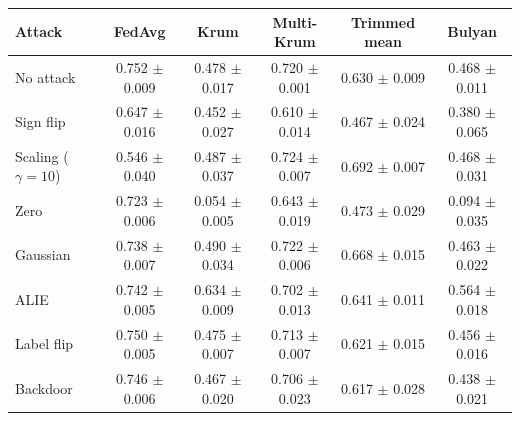 \begin{tabular}{lccccc}
\toprule
Attack & FedAvg & Krum & Multi-Krum & Trimmed mean & Bulyan \\
\midrule
No attack & 0.752 $\pm$ 0.009 & 0.478 $\pm$ 0.017 & 0.720 $\pm$ 0.001 & 0.630 $\pm$ 0.009 & 0.468 $\pm$ 0.011 \\
Sign flip & 0.647 $\pm$ 0.016 & 0.452 $\pm$ 0.027 & 0.610 $\pm$ 0.014 & 0.467 $\pm$ 0.024 & 0.380 $\pm$ 0.065 \\
Scaling ($\gamma=10$) & 0.546 $\pm$ 0.040 & 0.487 $\pm$ 0.037 & 0.724 $\pm$ 0.007 & 0.692 $\pm$ 0.007 & 0.468 $\pm$ 0.031 \\
Zero & 0.723 $\pm$ 0.006 & 0.054 $\pm$ 0.005 & 0.643 $\pm$ 0.019 & 0.473 $\pm$ 0.029 & 0.094 $\pm$ 0.035 \\
Gaussian & 0.738 $\pm$ 0.007 & 0.490 $\pm$ 0.034 & 0.722 $\pm$ 0.006 & 0.668 $\pm$ 0.015 & 0.463 $\pm$ 0.022 \\
ALIE & 0.742 $\pm$ 0.005 & 0.634 $\pm$ 0.009 & 0.702 $\pm$ 0.013 & 0.641 $\pm$ 0.011 & 0.564 $\pm$ 0.018 \\
Label flip & 0.750 $\pm$ 0.005 & 0.475 $\pm$ 0.007 & 0.713 $\pm$ 0.007 & 0.621 $\pm$ 0.015 & 0.456 $\pm$ 0.016 \\
Backdoor & 0.746 $\pm$ 0.006 & 0.467 $\pm$ 0.020 & 0.706 $\pm$ 0.023 & 0.617 $\pm$ 0.028 & 0.438 $\pm$ 0.021 \\
\bottomrule
\end{tabular}
